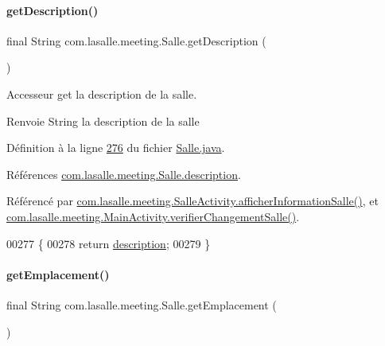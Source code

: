 \paragraph{\texorpdfstring{get\+Description()}{getDescription()}}
{\footnotesize\ttfamily final String com.\+lasalle.\+meeting.\+Salle.\+get\+Description (\begin{DoxyParamCaption}{ }\end{DoxyParamCaption})}



Accesseur get la description de la salle. 

\begin{DoxyReturn}{Renvoie}
String la description de la salle 
\end{DoxyReturn}


Définition à la ligne \hyperlink{_salle_8java_source_l00276}{276} du fichier \hyperlink{_salle_8java_source}{Salle.\+java}.



Références \hyperlink{_salle_8java_source_l00035}{com.\+lasalle.\+meeting.\+Salle.\+description}.



Référencé par \hyperlink{_salle_activity_8java_source_l00103}{com.\+lasalle.\+meeting.\+Salle\+Activity.\+afficher\+Information\+Salle()}, et \hyperlink{_main_activity_8java_source_l00291}{com.\+lasalle.\+meeting.\+Main\+Activity.\+verifier\+Changement\+Salle()}.


\begin{DoxyCode}
00277     \{
00278         \textcolor{keywordflow}{return} \hyperlink{classcom_1_1lasalle_1_1meeting_1_1_salle_a79547b79b4e812619f6cc764dbe7a80b}{description};
00279     \}
\end{DoxyCode}
\mbox{\label{classcom_1_1lasalle_1_1meeting_1_1_salle_ac58600d946b6553858cc41be032473cd}} 
\paragraph{\texorpdfstring{get\+Emplacement()}{getEmplacement()}}
{\footnotesize\ttfamily final String com.\+lasalle.\+meeting.\+Salle.\+get\+Emplacement (\begin{DoxyParamCaption}{ }\end{DoxyParamCaption})}



